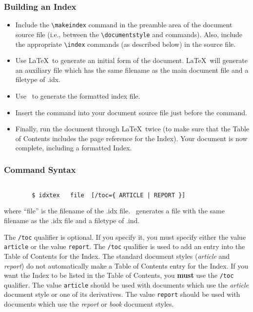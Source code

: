 \subsubsection{Building an Index}
                             

\begin{itemize}



\item Include the \verb~\makeindex~ command in the preamble area of the
document source file (i.e., between the \verb~\documentstyle~ and
\verb~~ commands).  Also, include the appropriate \verb~\index~
commands (as described below) in the source file.

\item Use \LaTeX\ to generate an initial form of the document.  \LaTeX\ will
generate an auxiliary file which has the same filename as the main document
file and a filetype of .idx.


\item Use \IdxTeX\ to generate the formatted index file.

\item Insert the command \verb++ into your document source file
just before the \verb~~ command. 

\item Finally, run the document through \LaTeX\ twice (to make sure that the
Table of Contents includes the page reference for the Index).  Your document is
now complete, including a formatted Index. 

\end{itemize}

\subsubsection{Command Syntax}

\begin{verbatim}

        $ idxtex   file  [/toc={ ARTICLE | REPORT }]

\end{verbatim}

where ``file'' is the filename of the .idx 
file.  \IdxTeX\ generates a file with the same filename as the .idx file and a
filetype of .ind. 

The \verb+/toc+ qualifier is optional.  If you
specify it, you must specify either the value \verb+article+ or the value
\verb+report+.  The \verb+/toc+ qualifier is used to add an entry into the Table of
Contents for the Index.  The standard document styles ({\em article\/} and
{\em report\/}) do not automatically make a Table of Contents entry for the 
Index.  If you want the Index to be listed in the Table of Contents, you 
{\bf must} use the \verb+/toc+ qualifier.  The value \verb+article+ should be used
with documents which use the {\em article\/} document style or one of its 
derivatives.  The value \verb+report+ should be used with documents which use
the {\em report\/} or {\em book\/} document styles. 

